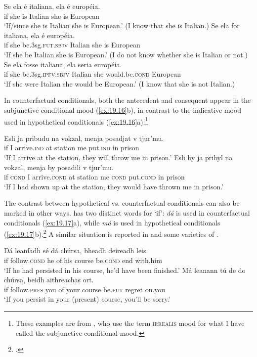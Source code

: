 \ea \label{ex:19.15}
\ea  \gll Se  ela  é  italiana,  ela  é  européia.\\
if  she  is  Italian  she  is  European\\
\glt ‘If/since she is Italian she is European.’ (I know that she is  {Italian}.)
\ex \gll Se  ela  for  italiana,  ela  é  européia.\\
if  she  be.3sg.\textsc{fut.sbjv}  Italian  she  is  European\\
\glt ‘If she be Italian she is European.’ (I do not know whether she is  {Italian} or not.)
\ex \gll  Se  ela  fosse  italiana,  ela  seria  européia.\\
if  she  be.3sg.\textsc{ipfv.sbjv}  Italian  she  would.be.\textsc{cond}  European\\
\glt ‘If she were Italian she would be European.’ (I know that she is not  {Italian}.)
\z \z


In  counterfactual conditionals, both the antecedent and consequent appear in the subjunctive-conditional mood (\ref{ex:19.16}b), in contrast to the indicative mood used in hypothetical conditionals (\ref{ex:19.16}a):\footnote{These examples are from \citet[251]{ChungTimberlake1985}, who use the term \textsc{irrealis} mood for what I have called the subjunctive-conditional mood.}


\ea \label{ex:19.16}
\ea  \gll Esli  ja  pribudu  na  vokzal,  menja  posadjat  v  tjur’mu.\\
if  I  arrive.\textsc{ind}  at  station  me  put.\textsc{ind}  in  prison\\
\glt ‘If I arrive at the station, they will throw me in prison.’ 
\ex \gll Esli  by  ja  pribyl  na  vokzal,  menja  by  posadili  v  tjur’mu.\hspace*{-1mm}\\
if  \textsc{cond}  I  arrive.\textsc{cond}  at  station  me  \textsc{cond}  put.\textsc{cond}  in  prison\\
\glt ‘If I had shown up at the station, they would have thrown me in prison.’
\z \z


The contrast between hypothetical vs. counterfactual conditionals can also be marked in other ways.  has two distinct words for ‘if’: \textit{dá} is used in counterfactual conditionals (\ref{ex:19.17}a), while \textit{má} is used in hypothetical conditionals (\ref{ex:19.17}b).\footnote{\citet{McCloskey2001}.} A similar situation is reported in  and some varieties of .


\ea \label{ex:19.17}
\ea   \gll Dá  leanfadh  sé  dá  chúrsa,  bheadh  deireadh  leis.\\
if  follow.\textsc{cond}  he  of.his  course  be.\textsc{cond}  end  with.him\\
\glt ‘If he had persisted in his course, he’d have been finished.’
\ex \gll  Má  leanann  tú  de  do  chúrsa,  beidh  aithreachas  ort.\\
if  follow.\textsc{pres}  you  of  your  course  be.\textsc{fut}  regret  on.you\\
\glt ‘If you persist in your (present) course, you’ll be sorry.’
\z \z


